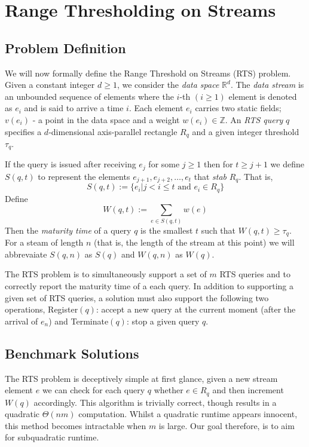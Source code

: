 \clearpage

\def\chaptertitle{Range Thresholding on Streams}

\lhead{\emph{\chaptertitle}}

\chapter{\chaptertitle}
\label{ch:rts}

\section{Problem Definition}
\label{sec:rts-definition}
We will now formally define the Range Threshold on Streams (RTS) problem. Given a constant integer $d\geq 1$, we consider the \textit{data space} $\mathbb{R}^d$. The \textit{data stream} is an unbounded sequence of elements where the $i$-th $(i\geq1)$ element is denoted as $e_i$ and is said to arrive a time $i$. Each element $e_i$ carries two static fields; $v(e_i)$ - a point in the data space and a weight $w(e_i)\in\mathbb{Z}$. An \textit{RTS query} $q$ specifies a $d$-dimensional axis-parallel rectangle $R_q$ and a given integer threshold $\tau_q$.

If the query is issued after receiving $e_j$ for some $j\geq 1$ then for $t\geq j+1$ we define $S(q,t)$ to represent the elements $e_{j+1},e_{j+2},\dots,e_t$ that \textit{stab} $R_q$. That is, 
$$S(q, t) := \{e_i | j < i \leq t \text{ and } e_i \in R_q\}$$
Define
$$W(q, t) := \sum_{e\in S(q,t)}w(e)$$
Then the \textit{maturity time} of a query $q$ is the smallest $t$ such that $W(q,t)\geq \tau_q$. For a steam of length $n$ (that is, the length of the stream at this point) we will abbrevaiate $S(q,n)$ as $S(q)$ and $W(q, n)$ as $W(q)$.

The RTS problem is to simultaneously support a set of $m$ RTS queries and to correctly report the maturity time of a each query. In addition to supporting a given set of RTS queries, a solution must also support the following two operations, Register$(q)$: accept a new query at the current moment (after the arrival of $e_n$) and Terminate$(q)$: stop a given query $q$.

\section{Benchmark Solutions}
\label{sec:benchmark-solutions}

The RTS problem is deceptively simple at first glance, given a new stream element $e$ we can check for each query $q$ whether $e \in R_q$ and then increment $W(q)$ accordingly. This algorithm is trivially correct, though results in a quadratic $\Theta(nm)$ computation. Whilst a quadratic runtime appears innocent, this method becomes intractable when $m$ is large. Our goal therefore, is to aim for subquadratic runtime.

